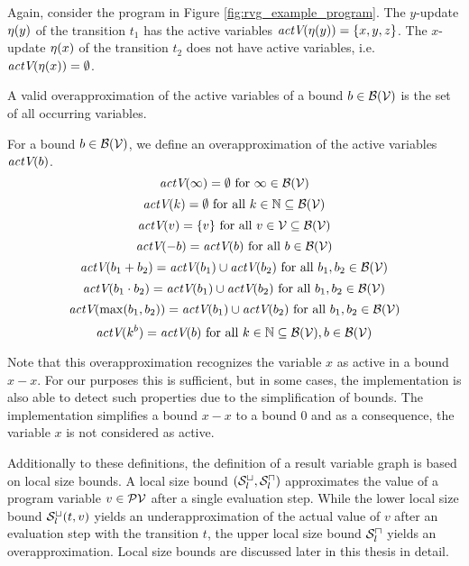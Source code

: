 \begin{example} 
  Again, consider the program in Figure \ref{fig:rvg_example_program}.
  The $y$-update $\eta(y)$ of the transition $t_1$ has the active variables $\emph{actV}(\eta(y)) = \lbrace x,y,z \rbrace$.
  The $x$-update $\eta(x)$ of the transition $t_2$ does not have active variables, i.e. $\emph{actV}(\eta(x)) = \emptyset$.
\end{example}

A valid overapproximation of the active variables of a bound $b \in \mathcal{B}(\mathcal{V})$ is the set of all occurring variables.
\begin{definition}
  For a bound $b \in \mathcal{B}(\mathcal{V})$, we define an overapproximation of the active variables $\emph{actV}(b)$.
  \[ \emph{actV}(\infty) = \emptyset \text{ for } \infty \in \mathcal{B}(\mathcal{V}) \]
  \[ \emph{actV}(k) = \emptyset \text{ for all } k \in \mathbb{N} \subseteq \mathcal{B}(\mathcal{V}) \] 
  \[ \emph{actV}(v) = \lbrace v \rbrace \text{ for all } v \in \mathcal{V} \subseteq \mathcal{B}(\mathcal{V}) \] 
  \[ \emph{actV}(-b) = \emph{actV}(b) \text{ for all } b \in \mathcal{B}(\mathcal{V}) \] 
  \[ \emph{actV}(b_1 + b_2) = \emph{actV}(b_1) \cup \emph{actV}(b_2) \text{ for all } b_1, b_2 \in \mathcal{B}(\mathcal{V}) \] 
  \[ \emph{actV}(b_1 \cdot b_2) = \emph{actV}(b_1) \cup \emph{actV}(b_2) \text{ for all } b_1, b_2 \in \mathcal{B}(\mathcal{V}) \] 
  \[ \emph{actV}(\max(b_1, b_2)) = \emph{actV}(b_1) \cup \emph{actV}(b_2) \text{ for all } b_1, b_2 \in \mathcal{B}(\mathcal{V}) \]
  \[ \emph{actV}(k^b) = \emph{actV}(b) \text{ for all } k \in \mathbb{N} \subseteq \mathcal{B}(\mathcal{V}), b \in \mathcal{B}(\mathcal{V}) \]  
\end{definition}

Note that this overapproximation recognizes the variable $x$ as active in a bound $x - x$.
For our purposes this is sufficient, but in some cases, the implementation is also able to detect such properties due to the simplification of bounds.
The implementation simplifies a bound $x - x$ to a bound $0$ and as a consequence, the variable $x$ is not considered as active.

Additionally to these definitions, the definition of a result variable graph is based on local size bounds.
A local size bound ${({\mathcal{S}^\sqcup_l}, {\mathcal{S}^\sqcap_l})}$ approximates the value of a program variable $v \in \mathcal{PV}$ after a single evaluation step.
While the lower local size bound ${\mathcal{S}^\sqcup_l}(t,v)$ yields an underapproximation of the actual value of $v$ after an evaluation step with the transition $t$, the upper local size bound ${\mathcal{S}^\sqcap_l}$ yields an overapproximation.
Local size bounds are discussed later in this thesis in detail.

